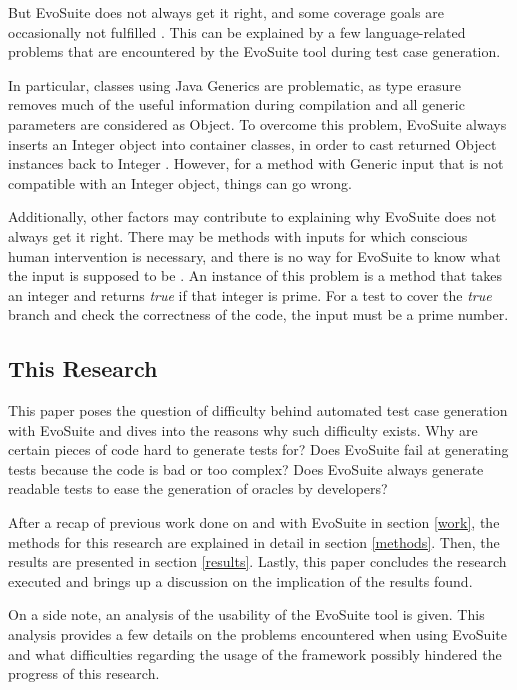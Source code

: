 But EvoSuite does not always get it right, and some coverage goals are occasionally not fulfilled \cite{FRASER2013}. 
This can be explained by a few language-related problems that are encountered by the EvoSuite tool during test case generation.

In particular, classes using Java Generics are problematic, as type erasure removes much of the useful information during compilation and all generic parameters are considered as Object. 
To overcome this problem, EvoSuite always inserts an Integer object into container classes, in order to cast returned Object instances back to Integer \cite{FRASER2013}. 
However, for a method with Generic input that is not compatible with an Integer object, things can go wrong. 

Additionally, other factors may contribute to explaining why EvoSuite does not always get it right.
There may be methods with inputs for which conscious human intervention is necessary, and there is no way for EvoSuite to know what the input is supposed to be \cite{FRASER2013}. 
An instance of this problem is a method that takes an integer and returns \textit{true} if that integer is prime. For a test to cover the \textit{true} branch and check the correctness of the code, the input must be a prime number. 

\subsection{This Research}

This paper poses the question of difficulty behind automated test case generation with EvoSuite and dives into the reasons why such difficulty exists. 
Why are certain pieces of code hard to generate tests for? 
Does EvoSuite fail at generating tests because the code is bad or too complex?
Does EvoSuite always generate readable tests to ease the generation of oracles by developers?

After a recap of previous work done on and with EvoSuite in section \ref{work}, the methods for this research are explained in detail in section \ref{methods}.
Then, the results are presented in section \ref{results}.
Lastly, this paper concludes the research executed and brings up a discussion on the implication of the results found. 

On a side note, an analysis of the usability of the EvoSuite tool is given. 
This analysis provides a few details on the problems encountered when using EvoSuite and what difficulties regarding the usage of the framework possibly hindered the progress of this research. 
